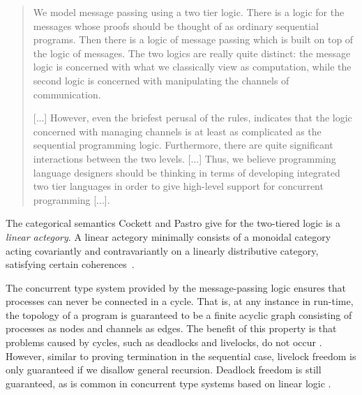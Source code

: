 \documentclass[acmsmall]{acmart}
\begin{document}
\begin{quote}
We model message passing using a two tier logic. There is a logic for the messages whose proofs should be thought of as ordinary sequential programs.
Then there is a logic of message passing which is built on top of the logic of messages. The two logics are really quite distinct: the message logic is concerned with what we classically view as computation, while the second logic is concerned with manipulating the channels of communication.

[...] However, even the briefest perusal of the rules, indicates that the logic concerned with managing channels is at least as complicated as the sequential programming logic. Furthermore, there are quite significant
interactions between the two levels. 
[...]
 Thus, we believe programming language designers should be thinking in terms of developing integrated two tier languages in order to give high-level support for concurrent programming [...]. 
\end{quote}
The categorical semantics Cockett and Pastro give for the two-tiered logic is a {\em linear actegory}.
A linear actegory minimally consists of a monoidal category acting covariantly and contravariantly on a linearly distributive category, 
satisfying certain coherences~\cite{CoP07, CS97}. 

The concurrent type system provided by the message-passing logic ensures that processes can never be connected in a cycle.
That is, at any instance in run-time, the topology of a program is guaranteed to be a finite acyclic graph consisting of processes as nodes and channels as edges.
The benefit of this property is that problems caused by cycles, such as deadlocks and livelocks, do not occur \cite{Ly18}.
However, similar to proving termination in the sequential case, livelock freedom is only guaranteed if we disallow general recursion.
Deadlock freedom is still guaranteed, as is common in concurrent type systems based on linear logic \cite{BELLIN199411, CPf2010, Wa12, CairesPT16, QKB21}.
\end{document}
